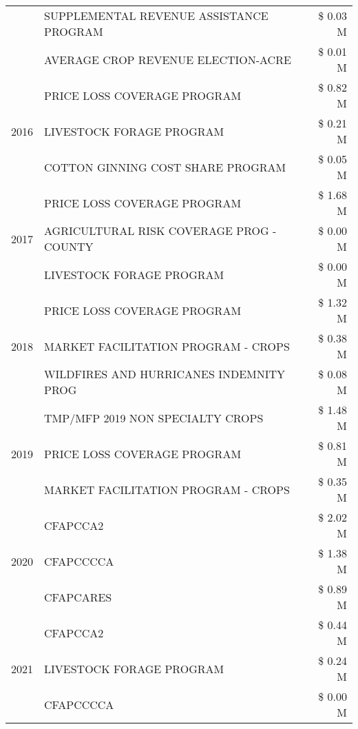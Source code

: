 \begin{tabular}{llr}
 & SUPPLEMENTAL REVENUE ASSISTANCE PROGRAM & \$ 0.03 M \\
 & AVERAGE CROP REVENUE ELECTION-ACRE & \$ 0.01 M \\
\cline{1-3}
\multirow[t]{3}{*}{2016} & PRICE LOSS COVERAGE PROGRAM & \$ 0.82 M \\
 & LIVESTOCK FORAGE PROGRAM & \$ 0.21 M \\
 & COTTON GINNING COST SHARE PROGRAM & \$ 0.05 M \\
\cline{1-3}
\multirow[t]{3}{*}{2017} & PRICE LOSS COVERAGE PROGRAM & \$ 1.68 M \\
 & AGRICULTURAL RISK COVERAGE PROG - COUNTY & \$ 0.00 M \\
 & LIVESTOCK FORAGE PROGRAM & \$ 0.00 M \\
\cline{1-3}
\multirow[t]{3}{*}{2018} & PRICE LOSS COVERAGE PROGRAM & \$ 1.32 M \\
 & MARKET FACILITATION PROGRAM - CROPS & \$ 0.38 M \\
 & WILDFIRES AND HURRICANES INDEMNITY PROG & \$ 0.08 M \\
\cline{1-3}
\multirow[t]{3}{*}{2019} & TMP/MFP 2019 NON SPECIALTY CROPS & \$ 1.48 M \\
 & PRICE LOSS COVERAGE PROGRAM & \$ 0.81 M \\
 & MARKET FACILITATION PROGRAM - CROPS & \$ 0.35 M \\
\cline{1-3}
\multirow[t]{3}{*}{2020} & CFAPCCA2 & \$ 2.02 M \\
 & CFAPCCCCA & \$ 1.38 M \\
 & CFAPCARES & \$ 0.89 M \\
\cline{1-3}
\multirow[t]{3}{*}{2021} & CFAPCCA2 & \$ 0.44 M \\
 & LIVESTOCK FORAGE PROGRAM & \$ 0.24 M \\
 & CFAPCCCCA & \$ 0.00 M \\
\cline{1-3}
\bottomrule
\end{tabular}
